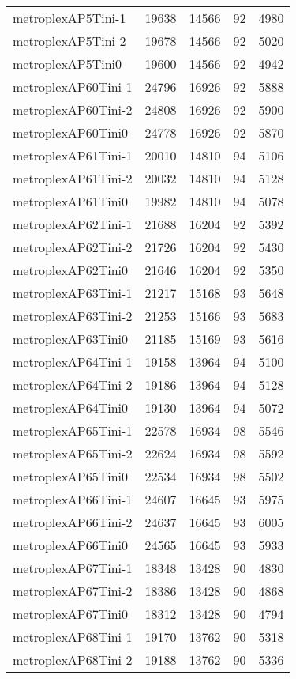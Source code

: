\begin{longtable}{lrrrr}
metroplexAP5Tini-1 & 19638 & 14566 & 92 & 4980 \\
metroplexAP5Tini-2 & 19678 & 14566 & 92 & 5020 \\
metroplexAP5Tini0 & 19600 & 14566 & 92 & 4942 \\
metroplexAP60Tini-1 & 24796 & 16926 & 92 & 5888 \\
metroplexAP60Tini-2 & 24808 & 16926 & 92 & 5900 \\
metroplexAP60Tini0 & 24778 & 16926 & 92 & 5870 \\
metroplexAP61Tini-1 & 20010 & 14810 & 94 & 5106 \\
metroplexAP61Tini-2 & 20032 & 14810 & 94 & 5128 \\
metroplexAP61Tini0 & 19982 & 14810 & 94 & 5078 \\
metroplexAP62Tini-1 & 21688 & 16204 & 92 & 5392 \\
metroplexAP62Tini-2 & 21726 & 16204 & 92 & 5430 \\
metroplexAP62Tini0 & 21646 & 16204 & 92 & 5350 \\
metroplexAP63Tini-1 & 21217 & 15168 & 93 & 5648 \\
metroplexAP63Tini-2 & 21253 & 15166 & 93 & 5683 \\
metroplexAP63Tini0 & 21185 & 15169 & 93 & 5616 \\
metroplexAP64Tini-1 & 19158 & 13964 & 94 & 5100 \\
metroplexAP64Tini-2 & 19186 & 13964 & 94 & 5128 \\
metroplexAP64Tini0 & 19130 & 13964 & 94 & 5072 \\
metroplexAP65Tini-1 & 22578 & 16934 & 98 & 5546 \\
metroplexAP65Tini-2 & 22624 & 16934 & 98 & 5592 \\
metroplexAP65Tini0 & 22534 & 16934 & 98 & 5502 \\
metroplexAP66Tini-1 & 24607 & 16645 & 93 & 5975 \\
metroplexAP66Tini-2 & 24637 & 16645 & 93 & 6005 \\
metroplexAP66Tini0 & 24565 & 16645 & 93 & 5933 \\
metroplexAP67Tini-1 & 18348 & 13428 & 90 & 4830 \\
metroplexAP67Tini-2 & 18386 & 13428 & 90 & 4868 \\
metroplexAP67Tini0 & 18312 & 13428 & 90 & 4794 \\
metroplexAP68Tini-1 & 19170 & 13762 & 90 & 5318 \\
metroplexAP68Tini-2 & 19188 & 13762 & 90 & 5336 \\

\end{longtable}
